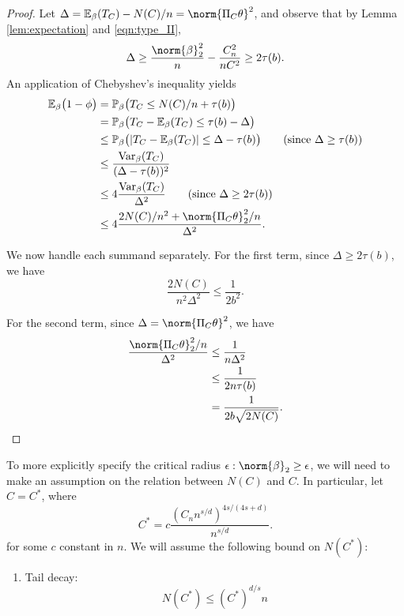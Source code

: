 \documentclass{article}
\newcommand{\abs}[1]{\left \lvert #1 \right \rvert}
\newcommand{\Var}{\mathrm{Var}}
\newcommand{\1}{\mathbf{1}}
\newcommand{\Pbb}{\mathbb{P}}
\newcommand{\Ebb}{\mathbb{E}}
\theoremstyle{alden}
\theoremstyle{aldenthm}
\theoremstyle{definition}
\theoremstyle{remark}
\begin{document}
\begin{proof}
	Let $\Delta = \Ebb_{\beta}(T_C) - N(C)/n = \norm{\Pi_C \theta}^2$, and observe that by Lemma \ref{lem:expectation} and \eqref{eqn:type_II},
	\begin{equation*}
	\Delta \geq \frac{\norm{\beta}_2^2}{n} - \frac{C_n^2}{nC^2} \geq 2 \tau(b).
	\end{equation*}
	An application of Chebyshev's inequality yields
	\begin{align*}
	\Ebb_{\beta}\bigl(1 - \phi\bigr) & = \Pbb_{\beta}\bigl(T_C \leq N(C)/n + \tau(b)\bigr) \\
	& = \Pbb_{\beta}\bigl(T_C - \Ebb_{\beta}(T_C) \leq \tau(b) - \Delta \bigr) \\
	& \leq \Pbb_{\beta}\bigl(\abs{T_C - \Ebb_{\beta}(T_C)} \leq \Delta - \tau(b) \bigr) \tag{since $\Delta \geq \tau(b)$}	\\
	& \leq \frac{\Var_{\beta}(T_C)}{(\Delta - \tau(b))^2} \\
	& \leq 4\frac{\Var_{\beta}(T_C)}{\Delta^2} \tag{since $\Delta \geq 2\tau(b)$} \\
	& \leq 4\frac{2N(C)/n^2 + \norm{\Pi_C\theta}_2^2/n}{\Delta^2}.
	\end{align*}
	
	We now handle each summand separately. For the first term, since $\Delta \geq 2 \tau(b)$, we have
	\begin{equation*}
	\frac{2N(C)}{n^2\Delta^2} \leq \frac{1}{2b^2}.
	\end{equation*}
	
	For the second term, since $\Delta = \norm{\Pi_C\theta}^2$, we have
	\begin{align*}
	\frac{\norm{\Pi_C\theta}_2^2/n}{\Delta^2} & \leq \frac{1}{n\Delta^2} \\
	& \leq \frac{1}{2n\tau(b)} \\
	& = \frac{1}{2b\sqrt{2N(C)}}.
	\end{align*}
\end{proof}

To more explicitly specify the critical radius $\epsilon: \norm{\beta}_2 \geq \epsilon$, we will need to make an assumption on the relation between $N(C)$ and $C$. In particular, let $C = C^*$, where
\begin{equation*}
C^* = c\frac{(C_n n^{s/d})^{4s/(4s + d)}}{n^{s/d}}.
\end{equation*}
for some $c$ constant in $n$. We will assume the following bound on $N(C^*)$:
\begin{enumerate}[label=(A\arabic*)]
	\item Tail decay:
	\label{asmp:tail_decay}
	\begin{equation*}
	N(C^*) \leq (C^*)^{d/s}n
	\end{equation*}
\end{enumerate}
\end{document}
